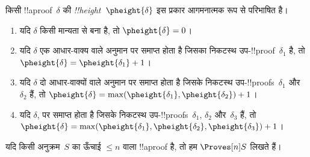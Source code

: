 \documentclass[../../../include/open-logic-section]{subfiles}
\begin{document}
\begin{defn}
किसी !!a{proof}~$\delta$ की \emph{!!{height}}~$\pheight{\delta}$ इस प्रकार
आगमनात्मक रूप से परिभाषित है।
\begin{enumerate}
  \item यदि $\delta$ किसी मान्यता से बना है, तो $\pheight{\delta} = 0$।
  \item यदि $\delta$ एक आधार-वाक्य वाले अनुमान पर समाप्त होता है जिसका
  निकटस्थ उप-!!{proof}~$\delta_1$ है, तो $\pheight{\delta} =
  \pheight{\delta_1} + 1$।
  \item यदि $\delta$ दो आधार-वाक्यों वाले अनुमान पर समाप्त होता है जिसके
  निकटस्थ उप-!!{proof}s~$\delta_1$ और~$\delta_2$ हैं, तो $\pheight{\delta} =
  \max(\pheight{\delta_1}, \pheight{\delta_2}) + 1$।
  \item यदि $\delta$, \Elim{\lor} पर समाप्त होता है जिसके निकटस्थ
  उप-!!{proof}s~$\delta_1$, $\delta_2$ और~$\delta_3$ हैं, तो
  $\pheight{\delta} = \max(\pheight{\delta_1}, \pheight{\delta_2},
  \pheight{\delta_3}) + 1$।
\end{enumerate}
यदि किसी अनुक्रम~$S$ का ऊँचाई $\le n$ वाला !!a{proof} है, तो हम $\Proves[n]
S$ लिखते हैं।
\end{defn}
\end{document}
